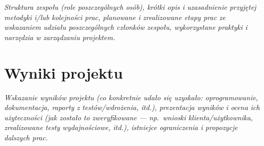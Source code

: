 \documentclass[polish,12pt]{aghthesis}
\begin{document}
\emph{Struktura zespołu (role poszczególnych osób), krótki opis i
  uzasadnienie przyjętej metodyki i/lub kolejności prac, planowane i
  zrealizowane etapy prac ze wskazaniem udziału poszczególnych
  członków zespołu, wykorzystane praktyki i narzędzia w zarządzaniu
  projektem.}

\section{Wyniki projektu}

\label{sec:wyniki-projektu}

\emph{Wskazanie wyników projektu (co konkretnie udało się uzyskało:
  oprogramowanie, dokumentacja, raporty z testów/wdrożenia, itd.), prezentacja wyników
  i ocena ich użyteczności (jak zostało to zweryfikowane --- np.\ wnioski
  klienta/użytkownika, zrealizowane testy wydajnościowe, itd.),
  istniejce ograniczenia i propozycje dalszych prac.}


\nocite{artykul2011,ksiazka2011,narzedzie2011,projekt2011}


\end{document}
